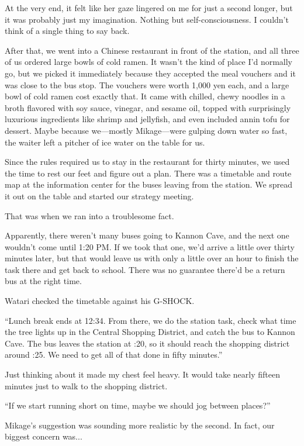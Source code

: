 \documentclass[
    a4paper,
    12pt,
    twoside,
    openany,
    UTF8,
    fontset=windows
]{ctexbook}
\begin{document}
At the very end, it felt like her gaze lingered on me for just a second longer, but it was probably just my imagination. Nothing but self-consciousness. I couldn't think of a single thing to say back.

After that, we went into a Chinese restaurant in front of the station, and all three of us ordered large bowls of cold ramen. It wasn't the kind of place I'd normally go, but we picked it immediately because they accepted the meal vouchers and it was close to the bus stop. The vouchers were worth 1,000 yen each, and a large bowl of cold ramen cost exactly that. It came with chilled, chewy noodles in a broth flavored with soy sauce, vinegar, and sesame oil, topped with surprisingly luxurious ingredients like shrimp and jellyfish, and even included annin tofu for dessert. Maybe because we---mostly Mikage---were gulping down water so fast, the waiter left a pitcher of ice water on the table for us.

Since the rules required us to stay in the restaurant for thirty minutes, we used the time to rest our feet and figure out a plan. There was a timetable and route map at the information center for the buses leaving from the station. We spread it out on the table and started our strategy meeting.

That was when we ran into a troublesome fact.

Apparently, there weren't many buses going to Kannon Cave, and the next one wouldn't come until 1:20 PM. If we took that one, we'd arrive a little over thirty minutes later, but that would leave us with only a little over an hour to finish the task there and get back to school. There was no guarantee there'd be a return bus at the right time.

Watari checked the timetable against his G-SHOCK.

``Lunch break ends at 12:34. From there, we do the station task, check what time the tree lights up in the Central Shopping District, and catch the bus to Kannon Cave. The bus leaves the station at :20, so it should reach the shopping district around :25. We need to get all of that done in fifty minutes.''

Just thinking about it made my chest feel heavy. It would take nearly fifteen minutes just to walk to the shopping district.

``If we start running short on time, maybe we should jog between places?''

Mikage's suggestion was sounding more realistic by the second. In fact, our biggest concern was...
\end{document}
